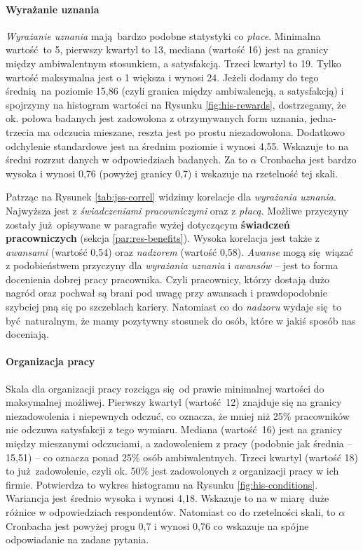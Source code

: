 \paragraph{Wyrażanie uznania} \textit{Wyrażanie uznania} mają bardzo podobne statystyki co \textit{płace}. Minimalna wartość to 5, pierwszy kwartyl to 13, mediana (wartość 16) jest na granicy między ambiwalentnym stosunkiem, a satysfakcją. Trzeci kwartyl to 19. Tylko wartość maksymalna jest o 1 większa i wynosi 24. Jeżeli dodamy do tego średnią na poziomie 15,86 (czyli granica między ambiwalencją, a satysfakcją) i spojrzymy na histogram wartości na Rysunku \ref{fig:his-rewards},
dostrzegamy, że ok. połowa badanych jest zadowolona z otrzymywanych form uznania, jedna-trzecia ma odczucia mieszane, reszta jest po prostu niezadowolona. Dodatkowo odchylenie standardowe jest na średnim poziomie i wynosi 4,55. Wskazuje to na średni rozrzut danych w odpowiedziach badanych. Za to $\alpha$ Cronbacha jest bardzo wysoka i wynosi 0,76 (powyżej granicy 0,7) i wskazuje na rzetelność tej skali.

Patrząc na Rysunek \ref{tab:jss-correl} widzimy korelacje dla \textit{wyrażania uznania}. Najwyższa jest z \textit{świadczeniami pracowniczymi} oraz z \textit{płacą}. Możliwe przyczyny zostały już opisywane w paragrafie wyżej dotyczącym \textbf{świadczeń pracowniczych} (sekcja \ref{par:res-benefits}). Wysoka korelacja jest także z \textit{awansami} (wartość 0,54) oraz \textit{nadzorem} (wartość 0,58). \textit{Awanse} mogą się wiązać z podobieństwem przyczyny dla \textit{wyrażania uznania} i \textit{awansów} -- jest to forma
docenienia dobrej pracy pracownika. Czyli pracownicy, którzy dostają dużo nagród oraz pochwał są brani pod uwagę przy awansach i prawdopodobnie szybciej pną się po szczeblach kariery. Natomiast co do \textit{nadzoru} wydaje się to być naturalnym, że mamy pozytywny stosunek do osób, które w jakiś sposób nas doceniają.

\paragraph{Organizacja pracy} Skala dla organizacji pracy rozciąga się od prawie minimalnej wartości do maksymalnej możliwej. Pierwszy kwartyl (wartość 12) znajduje się na granicy niezadowolenia i niepewnych odczuć, co oznacza, że mniej niż 25\% pracowników nie odczuwa satysfakcji z tego wymiaru. Mediana (wartość 16) jest na granicy między mieszanymi odczuciami, a zadowoleniem z pracy (podobnie jak średnia -- 15,51) -- co oznacza ponad 25\% osób ambiwalentnych. Trzeci kwartyl (wartość 18) to już zadowolenie, czyli ok. 50\% jest zadowolonych z 
organizacji pracy w ich firmie. Potwierdza to wykres histogramu na Rysunku \ref{fig:his-conditions}. Wariancja jest średnio wysoka i wynosi 4,18. Wskazuje to na w miarę duże różnice w odpowiedziach respondentów. Natomiast co do rzetelności skali, to $\alpha$ Cronbacha jest powyżej progu 0,7 i wynosi 0,76 co wskazuje na spójne odpowiadanie na zadane pytania.

